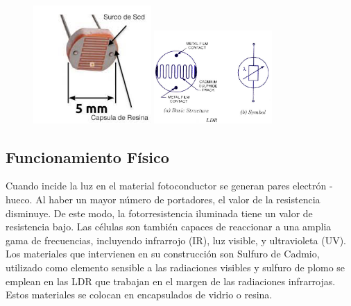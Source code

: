 \documentclass[12pt, fleqn]{article}                            %
\theoremstyle{break}                                            %
\begin{document}
        
            \begin{figure}[h]
                \centering
                \includegraphics[width=0.4\textwidth]{Estructura}
                \includegraphics[width=0.4\textwidth]{Estructura2}
            \end{figure}
            


        \subsection{Funcionamiento Físico}

            Cuando incide la luz en el material fotoconductor se generan pares
            electrón - hueco. Al haber un mayor número de portadores, el valor
            de la resistencia disminuye. De este modo, la fotorresistencia
            iluminada tiene un valor de resistencia bajo. Las células son también
            capaces de reaccionar a una amplia gama de frecuencias, incluyendo
            infrarrojo (IR), luz visible, y ultravioleta (UV). Los materiales que
            intervienen en su construcción son Sulfuro de Cadmio, utilizado
            como elemento sensible a las radiaciones visibles y sulfuro de plomo
            se emplean en las LDR que trabajan en el margen de las radiaciones
            infrarrojas. Estos materiales se colocan en encapsulados de vidrio o
            resina.
\end{document}
